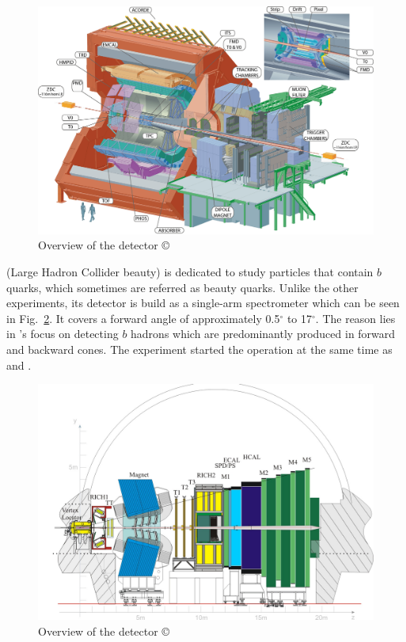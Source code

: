\documentclass[bachelor,ngerman,english]{GAUBM}
\begin{document}
\begin{figure}[t]
    \centering
    \includegraphics[width=.8\textwidth]{figures/lhc/detector_alice.jpg}
    \caption{Overview of the \alice detector \copyright{\cern}}
    \label{fig:detector_alice}
\end{figure}

\lhcb (Large Hadron Collider beauty) \cite{other:lhcb} is dedicated to study particles that contain $b$ quarks, which sometimes are referred as beauty quarks. Unlike the other experiments, its detector is build as a single-arm spectrometer which can be seen in Fig.~\ref{fig:detector_lhcb}. It covers a forward angle of approximately 0.5$^\circ$ to 17$^\circ$. The reason lies in \lhcb's focus on detecting $b$ hadrons which are predominantly produced in forward and backward cones. The \lhcb experiment started the operation at the same time as \atlas and \cms.

\begin{figure}[t]
    \centering
    \includegraphics[width=.8\textwidth]{figures/lhc/detector_lhcb.jpg}
    \caption{Overview of the \lhcb detector \copyright{\cern}}
    \label{fig:detector_lhcb}
\end{figure}
\end{document}
